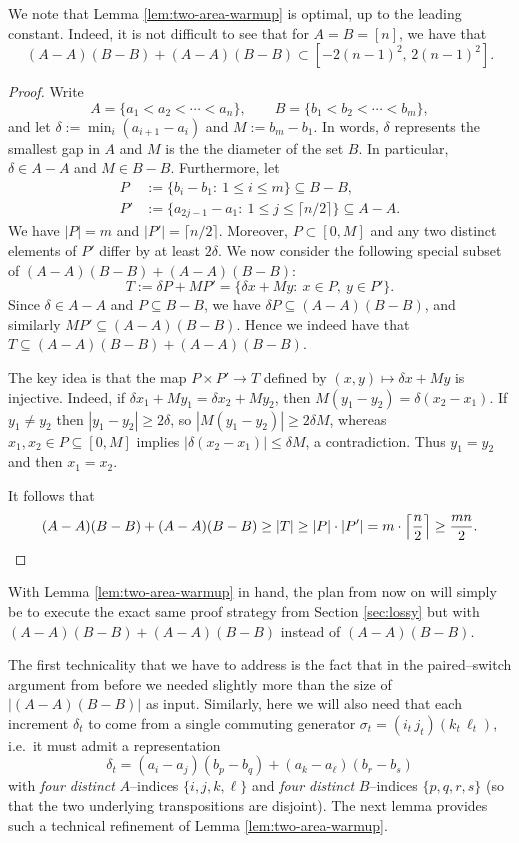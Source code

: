 \documentclass[12pt]{amsart}
\theoremstyle{definition}
\theoremstyle{remark}
\begin{document}
We note that Lemma \ref{lem:two-area-warmup} is optimal, up to the leading constant. Indeed, it is not difficult to see that for $A=B=[n]$, we have that
$$(A-A)(B-B)+(A-A)(B-B) \subset [-2(n-1)^2,\,2(n-1)^2].$$

\begin{proof} 
Write
$$A=\{a_1<a_2<\cdots<a_n\},\qquad B=\{b_1<b_2<\cdots<b_m\},$$
and let $\delta := \min_{i}(a_{i+1}-a_i)$ and $M := b_m-b_1$. In words, $\delta$ represents the smallest gap in $A$ and $M$ is the the diameter of the set $B$. In particular, $\delta\in A-A$ and $M\in B-B$. Furthermore, let
\begin{align*}
P&:=\{b_i-b_1:\ 1\le i\le m\}\subseteq B-B,\\
P'&:=\{a_{2j-1}-a_1:\ 1\le j\le \lceil n/2\rceil\}\subseteq A-A.
\end{align*}
We have $|P|=m$ and $|P'|=\lceil n/2\rceil$. Moreover, $P \subset [0,M]$ and any two distinct elements of $P'$ differ by at least $2\delta$. We now consider the following special subset of $(A-A)(B-B)+(A-A)(B-B)$:
\[
T:=\delta P + M P'=\{\delta x+My:\ x\in P,\ y\in P'\}.
\]
Since $\delta\in A-A$ and $P\subseteq B-B$, we have $\delta P\subseteq (A-A)(B-B)$, and similarly
$MP'\subseteq (A-A)(B-B)$. Hence we indeed have that $T\subseteq (A-A)(B-B)+(A-A)(B-B)$.

The key idea is that the map $P \times P' \to T$ defined by $(x,y)\mapsto \delta x+My$ is injective. Indeed, if
$\delta x_1+My_1=\delta x_2+My_2$, then $M(y_1-y_2)=\delta(x_2-x_1)$.  If $y_1\neq y_2$ then
$|y_1-y_2|\ge 2\delta$, so $|M(y_1-y_2)|\ge 2\delta M$, whereas $x_1,x_2\in P\subseteq[0,M]$ implies
$|\delta(x_2-x_1)|\le \delta M$, a contradiction.  Thus $y_1=y_2$ and then $x_1=x_2$.

It follows that
$$(A-A)(B-B)+(A-A)(B-B) \geq |T| \geq |P|\cdot |P'| = m\cdot \Bigl\lceil\frac{n}{2}\Bigr\rceil \geq \frac{mn}{2}.$$
\end{proof}

\medskip
With Lemma \ref{lem:two-area-warmup} in hand, the plan from now on will simply be to execute the exact same proof strategy from Section \ref{sec:lossy} but with $(A-A)(B-B)+(A-A)(B-B)$ instead of $(A-A)(B-B)$. 

The first technicality that we have to address is the fact that in the paired--switch argument from before we needed slightly more than the size of $|(A-A)(B-B)|$ as input. Similarly, here we will also need that each increment $\delta_t$ to come from a single commuting generator $\sigma_t=(i_t\,j_t)(k_t\,\ell_t)$, i.e.\ it must admit a representation
\[
\delta_t=(a_i-a_j)(b_p-b_q)+(a_k-a_\ell)(b_r-b_s)
\]
with \emph{four distinct} $A$--indices $\{i,j,k,\ell\}$ and \emph{four distinct} $B$--indices
$\{p,q,r,s\}$ (so that the two underlying transpositions are disjoint). The next lemma provides such a technical refinement of Lemma \ref{lem:two-area-warmup}. 
\end{document}
